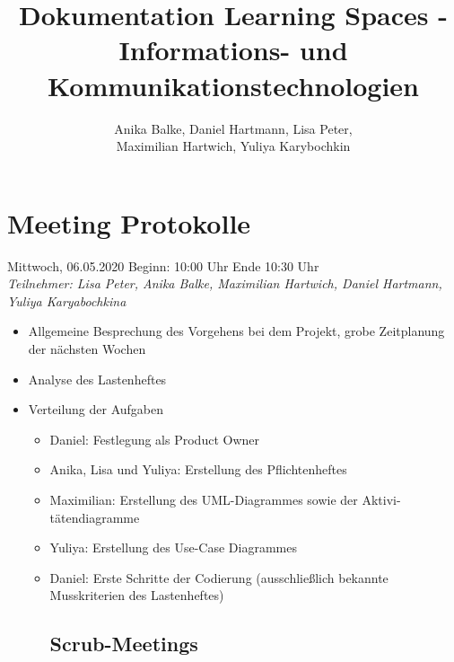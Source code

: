 \documentclass[11pt, a4paper]{article}
\begin{document}
\begin{titlepage}

 \centering 

\title{Dokumentation Learning Spaces - Informations- und Kommunikationstechnologien}
\date{}
\author{Anika Balke, Daniel Hartmann, Lisa Peter,   \\
Maximilian Hartwich, Yuliya Karybochkin}

\vfill


\maketitle

 \end{titlepage}
 


\section{Meeting Protokolle}
{\large Mittwoch, 06.05.2020 Beginn: 10:00 Uhr Ende 10:30 Uhr}  \\
\textit{Teilnehmer: Lisa Peter, Anika Balke, Maximilian Hartwich, Daniel Hartmann, Yuliya Karyabochkina}

 \begin{itemize}
  \item Allgemeine Besprechung des Vorgehens bei dem Projekt, grobe Zeitplanung der nächsten Wochen
 \item Analyse des Lastenheftes
 \item Verteilung der Aufgaben
 
 \begin{itemize}
 \item Daniel: Festlegung als Product Owner
 \item Anika, Lisa und Yuliya: Erstellung des Pflichtenheftes
 \item Maximilian: Erstellung des UML-Diagrammes sowie der Aktivi-
 tätendiagramme
 \item Yuliya: Erstellung des Use-Case Diagrammes
 \item Daniel: Erste Schritte der Codierung (ausschließlich bekannte Musskriterien des Lastenheftes)
 
\subsection{Scrub-Meetings} 
 
  \end{itemize}
  \end{itemize}
      
\end{document}

